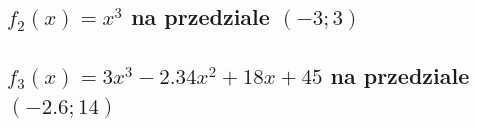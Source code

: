 \documentclass{article}
\begin{document}
        \noindent
    \subsection{$f_2(x) = x^3$ na przedziale $(-3;3)$}
        
        \noindent
    \subsection{$f_3(x) = 3x^3 - 2.34x^2 + 18x + 45$ na przedziale $(-2.6;14)$}

        \noindent
\end{document}
